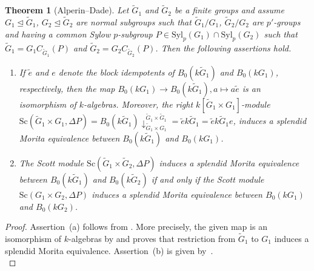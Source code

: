 \documentclass[12pt,a4paper]{amsart}
\theoremstyle{plain}\newtheorem{Theorem}{Theorem}[section]
\theoremstyle{plain}\newtheorem{Conjecture}[Theorem]{Conjecture}
\theoremstyle{plain}\newtheorem{Corollary}[Theorem]{Corollary}
\theoremstyle{plain}\newtheorem{Lemma}[Theorem]{Lemma}
\theoremstyle{plain}\newtheorem{Proposition}[Theorem]{Proposition}
\theoremstyle{definition}\newtheorem{Definition}[Theorem]{Definition}
\theoremstyle{definition}\newtheorem{Example}[Theorem]{Example}
\theoremstyle{definition}\newtheorem{Examples}[Theorem]{Examples}
\theoremstyle{definition}\newtheorem{Remark}[Theorem]{Remark}
\theoremstyle{definition}\newtheorem{Question}[Theorem]{Question}
\theoremstyle{definition}\newtheorem{Notation}[Theorem]{Notation}
\theoremstyle{definition}\newtheorem{Hypothesis}[Theorem]{Hypothesis}
\theoremstyle{definition}\newtheorem{Assumption}[Theorem]{Assumption}
\theoremstyle{definition}\newtheorem{Strategy}[Theorem]{Strategy}
\theoremstyle{definition}\newtheorem{Contents}[Theorem]{Contents}
\theoremstyle{definition}\newtheorem{Computations}[Theorem]{Computations}
\theoremstyle{definition}\newtheorem{Equivalences}[Theorem]{Equivalences}
\theoremstyle{definition}\newtheorem{Notation/Definition}[Theorem]{Notation/Definition}
\theoremstyle{definition}\newtheorem{noth}[Theorem]{}
\theoremstyle{plain}\newtheorem{Step}[Theorem]{Step}
\def\Syl{\mathrm{Syl}}
\begin{document}
\begin{Theorem}[Alperin--Dade]\label{thm:AlperinDade}
Let $\widetilde{G}_{1}$ and $\widetilde{G}_{2}$ be a finite groups and assume $G_{1}\trianglelefteq \widetilde{G}_{1}$, $G_{2}\trianglelefteq \widetilde{G}_{2}$ 
are normal subgroups such that  $\widetilde{G}_{1}/G_{1}$, $\widetilde{G}_{2}/G_{2}$ are  $p'$-groups and having a common Sylow $p$-subgroup  $P\in\Syl_p(G_{1})\cap\Syl_{p}(G_{2})$ such that 
$\widetilde{G}_{1}=G_{1}C_{\widetilde{G}_{1}}(P)$ and $\widetilde{G}_{2}=G_{2}C_{\widetilde{G}_{2}}(P)$.  Then the following assertions hold. 
\begin{enumerate} 
\renewcommand{\labelenumi}{\rm{(\alph{enumi})}} 
\item
If $\tilde{e}$ and $e$ denote the block idempotents of $B_0(k\widetilde{G}_{1})$ 
and $B_0(kG_{1})$, respectively, then 
the map $B_0(kG_{1})\longrightarrow B_0(k\widetilde{G}_{1}), a\mapsto a\tilde{e}$ 
is an isomorphism of $k$-algebras. 
Moreover, the right $k[\widetilde{G}_{1}\times G_{1}]$-module
${\mathrm{Sc}}(\widetilde G_{1}\times G_{1},\Delta P) 
=B_0(k\widetilde G_{1}){\downarrow}^{\widetilde G_{1}\times\widetilde G_{1}}_{\widetilde{G}_{1}\times G_{1}}=\tilde{e}k\widetilde{G}_{1}=\tilde{e}k\widetilde{G}_{1}e$, 
induces a splendid Morita equivalence between $B_0(k\widetilde G_{1})$ and $B_0(kG_{1})$. 
\item
The Scott module ${\mathrm{Sc}}(\widetilde G_{1}\times\widetilde G_{2}, \Delta P)$ 
induces a splendid Morita equivalence 
between $B_0(k\widetilde G_{1})$ and $B_0(k\widetilde G_{2})$ if and only if  the Scott module 
${\mathrm{Sc}}(G_{1}\times G_{2}, \Delta P)$ induces a
splendid Morita equivalence 
between $B_0(kG_{1})$ and $B_0(kG_{2})$. 
\end{enumerate}
\end{Theorem} 
%
\begin{proof} 
Assertion~(a) follows from \cite{Alp76, Dad77}. More precisely, the given map 
is an isomorphism of $k$-algebras by \cite[Theorem]{Dad77} and 
\cite[Theorems 1 and  2]{Alp76} proves that restriction from $\widetilde{G}_{1}$ to $G_{1}$ induces a splendid Morita equivalence. 
Assertion~(b) is given by~\cite[Lemma~5.1]{KLS20}.\\
\end{proof}
\end{document}

